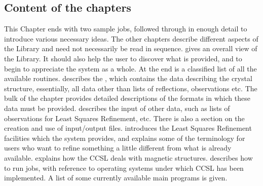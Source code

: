 \subsection{Content of the chapters} 
This Chapter ends with two sample jobs, followed through in enough
detail to introduce various necessary ideas.  The other chapters describe
different aspects of the Library and need not necessarily be read in
sequence.
\pn
{} gives an overall view of the Library.  It should also help the
user to discover what is provided, and to begin to appreciate the system as
a whole.  At the end is a classified list of all the available routines.
\pn
{}
 describes the ,  which contains the
 data describing the crystal structure, essentially, all data other than lists
of reflections,  observations etc.  The bulk of the chapter provides detailed
descriptions of the formats in which these data must be provided.
\pn
{}
describes the input of other data, such as lists of 
observations for Least Squares Refinement, etc.  There is also a
section on the creation and use of input/output files.
\pn 
{}
introduces the Least Squares Refinement facilities which the system provides,
and explains some of the terminology for users who want to refine
something a little different from what is already available.
\pn 
{}
explains how the CCSL deals with magnetic structures.
\pn
{}
describes how to run jobs, with reference to operating
systems under which CCSL has been implemented.  A list of some currently
available main programs is given.
\pn  
